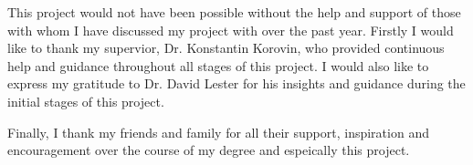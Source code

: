This project would not have been possible without the help and support of those with whom I have discussed my project with over the past year. Firstly I would like to thank my supervior, Dr. Konstantin Korovin, who provided continuous help and guidance throughout all stages of this project. I would also like to express my gratitude to Dr. David Lester for his insights and guidance during the initial stages of this project.

Finally, I thank my friends and family for all their support, inspiration and encouragement over the course of my degree and espeically this project.